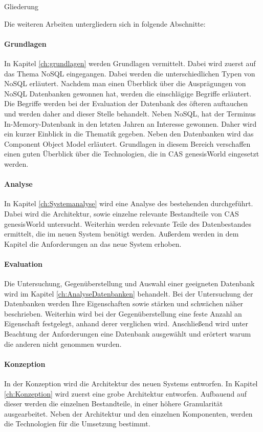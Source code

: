 Gliederung

Die weiteren Arbeiten untergliedern sich in folgende Abschnitte: 
 
\paragraph{Grundlagen} In Kapitel \ref{ch:grundlagen} werden Grundlagen vermittelt. Dabei wird zuerst auf das Thema NoSQL eingegangen. Dabei werden die unterschiedlichen Typen von NoSQL erläutert. Nachdem man einen Überblick über die Ausprägungen von NoSQL Datenbanken gewonnen hat, werden die einschlägige Begriffe erläutert. Die Begriffe werden bei der Evaluation der Datenbank des öfteren auftauchen und werden daher and dieser Stelle behandelt. Neben NoSQL, hat der Terminus In-Memory-Datenbank in den letzten Jahren an Interesse gewonnen. Daher wird ein kurzer Einblick in die Thematik gegeben. Neben den Datenbanken wird das Component Object Model erläutert. Grundlagen in diesem Bereich verschaffen einen guten Überblick über die Technologien, die in CAS genesisWorld eingesetzt werden. 

\paragraph{Analyse} In Kapitel \ref{ch:Systemanalyse} wird eine Analyse des bestehenden durchgeführt. Dabei wird die Architektur, sowie einzelne relevante Bestandteile von CAS genesisWorld untersucht. Weiterhin werden relevante Teile des Datenbestandes ermittelt, die im neuen System benötigt werden. Außerdem werden in dem Kapitel die Anforderungen an das neue System erhoben.

\paragraph{Evaluation} Die Untersuchung, Gegenüberstellung und Auswahl einer geeigneten Datenbank wird im Kapitel \ref{ch:AnalyseDatenbanken} behandelt. Bei der Untersuchung der Datenbanken werden Ihre Eigenschaften sowie stärken und schwächen näher beschrieben. Weiterhin wird bei der Gegenüberstellung eine feste Anzahl an Eigenschaft festgelegt, anhand derer verglichen wird. Anschließend wird unter Beachtung der Anforderungen eine Datenbank ausgewählt und erörtert warum die anderen nicht genommen wurden.  

\paragraph{Konzeption} In der Konzeption wird die Architektur des neuen Systems entworfen. In Kapitel \ref{ch:Konzeption} wird zuerst eine grobe Architektur entworfen. Aufbauend auf dieser werden die einzelnen Bestandteile, in einer höhere Granularität ausgearbeitet. Neben der Architektur und den einzelnen Komponenten, werden die Technologien für die Umsetzung bestimmt. 

